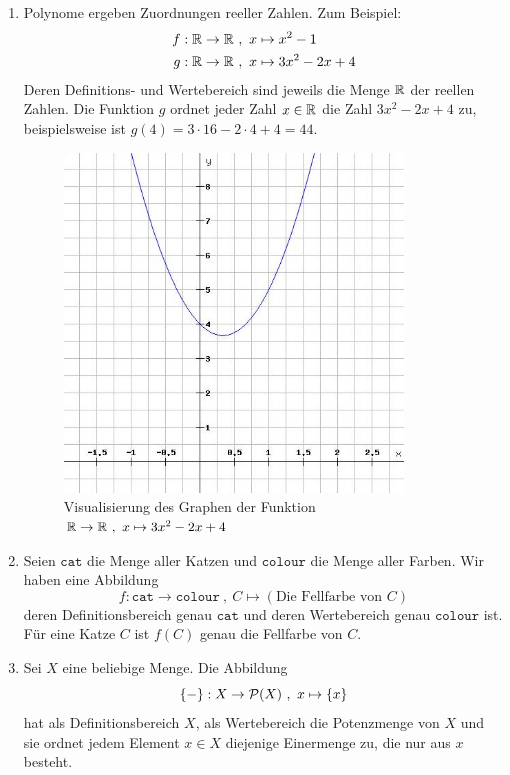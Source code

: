 \begin{bsp} \quad
    \begin{enumerate}
        \item Polynome ergeben Zuordnungen reeller Zahlen. Zum Beispiel:
        \begin{align*}
            f: \mathbb R \to \mathbb R \ & ,\ x  \mapsto x^2-1 \\
            g: \mathbb R \to \mathbb R \ & ,\  x  \mapsto 3x^2-2x+4
        \end{align*}
        Deren Definitions- und Wertebereich sind jeweils die Menge $\mathbb R$ der reellen Zahlen. Die Funktion $g$ ordnet jeder Zahl $x\in\mathbb R$ die Zahl $3x^2-2x+4$ zu, beispielsweise ist $g(4) = 3\cdot 16 - 2\cdot 4 + 4 = 44$.
        \begin{figure}[ht]
            \includegraphics[width=9cm]{./_img/Polynom-Plot.jpeg}
            \centering \caption{Visualisierung des Graphen der Funktion $\mathbb R\to \mathbb R \ ,\ x\mapsto 3x^2-2x+4$}
        \end{figure}
        \item Seien $\mathtt{cat}$ die Menge aller Katzen und $\mathtt{colour}$ die Menge aller Farben. Wir haben eine Abbildung
            \[ f: \mathtt{cat} \to \mathtt{colour} \ ,\ C \mapsto (\text{Die Fellfarbe von $C$}) \]
        deren Definitionsbereich genau $\mathtt{cat}$ und deren Wertebereich genau $\mathtt{colour}$ ist. Für eine Katze $C$ ist $f(C)$ genau die Fellfarbe von $C$.
        \item Sei $X$ eine beliebige Menge. Die Abbildung
            \[ \{-\}: X \to \mathcal P(X) \ ,\ x \mapsto \{x\} \]
        hat als Definitionsbereich $X$, als Wertebereich die Potenzmenge von $X$ und sie ordnet jedem Element $x \in X$ diejenige Einermenge zu, die nur aus $x$ besteht. 


\end{enumerate}
\end{bsp}
